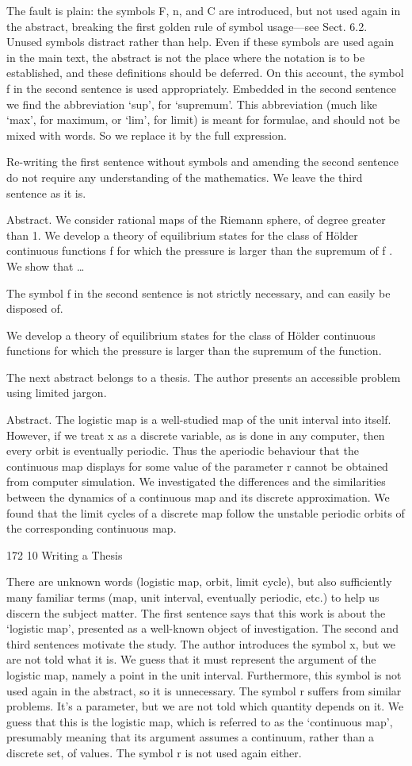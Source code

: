 \documentclass[11pt]{article}
\theoremstyle{plain}
\theoremstyle{definition}
\begin{document}
The fault is plain: the symbols F, n, and C are introduced, but not used again in the abstract, breaking the first golden rule of symbol usage---see Sect. 6.2. Unused symbols distract rather than help. Even if these symbols are used again in the main text, the abstract is not the place where the notation is to be established, and these definitions should be deferred. On this account, the symbol f in the second sentence is used appropriately. Embedded in the second sentence we find the abbreviation `sup', for `supremum'. This abbreviation (much like `max', for maximum, or `lim', for limit) is meant for formulae, and should not be mixed with words. So we replace it by the full expression.

Re-writing the first sentence without symbols and amending the second sentence do not require any understanding of the mathematics. We leave the third sentence as it is.

Abstract. We consider rational maps of the Riemann sphere, of degree greater than 1. We develop a theory of equilibrium states for the class of Hölder continuous functions f for which the pressure is larger than the supremum of f . We show that \dots{}

The symbol f in the second sentence is not strictly necessary, and can easily be disposed of.

We develop a theory of equilibrium states for the class of Hölder continuous functions for which the pressure is larger than the supremum of the function.

The next abstract belongs to a thesis. The author presents an accessible problem using limited jargon.

Abstract. The logistic map is a well-studied map of the unit interval into itself. However, if we treat x as a discrete variable, as is done in any computer, then every orbit is eventually periodic. Thus the aperiodic behaviour that the continuous map displays for some value of the parameter r cannot be obtained from computer simulation. We investigated the differences and the similarities between the dynamics of a continuous map and its discrete approximation. We found that the limit cycles of a discrete map follow the unstable periodic orbits of the corresponding continuous map.

172 10 Writing a Thesis

There are unknown words (logistic map, orbit, limit cycle), but also sufficiently many familiar terms (map, unit interval, eventually periodic, etc.) to help us discern the subject matter. The first sentence says that this work is about the `logistic map', presented as a well-known object of investigation. The second and third sentences motivate the study. The author introduces the symbol x, but we are not told what it is. We guess that it must represent the argument of the logistic map, namely a point in the unit interval. Furthermore, this symbol is not used again in the abstract, so it is unnecessary. The symbol r suffers from similar problems. It's a parameter, but we are not told which quantity depends on it. We guess that this is the logistic map, which is referred to as the `continuous map', presumably meaning that its argument assumes a continuum, rather than a discrete set, of values. The symbol r is not used again either.
\end{document}
